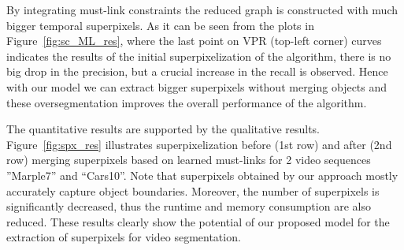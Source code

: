 By integrating must-link constraints the reduced graph is constructed with 
much bigger temporal superpixels. As it can be seen from the plots in Figure~\ref{fig:sc_ML_res}, where the last point on VPR (top-left corner) curves indicates the results of 
the initial superpixelization of the algorithm, there is no big drop in the precision, but a crucial increase in the recall is observed. Hence with our model we can extract bigger superpixels without merging objects and
these oversegmentation improves the overall performance of the algorithm.

The quantitative results are supported by the qualitative results. Figure~\ref{fig:spx_res} illustrates superpixelization before (1st row) and after (2nd row) merging superpixels based on learned must-links for 2 video sequences 
''Marple7'' and ``Cars10''. Note that superpixels obtained by our approach mostly accurately capture object boundaries. Moreover, the number of superpixels is significantly decreased, 
thus the runtime and memory consumption are also reduced. These results clearly show the potential of our proposed model for the extraction of superpixels for video segmentation.
% 
